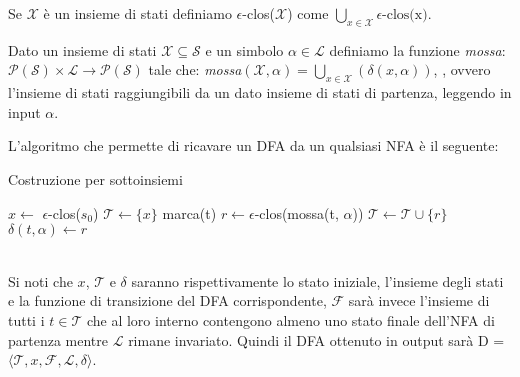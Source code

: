 \begin{remark}
    Se $\mathcal{X}$ è un insieme di stati definiamo $\epsilon$-clos($\mathcal{X}$) come $\bigcup_{x \in \mathcal{X}} \epsilon \mbox{-clos(x)}$.
\end{remark}

\begin{definition}[Mossa]
    Dato un insieme di stati $\mathcal{X} \subseteq \mathcal{S}$ e un simbolo $\alpha \in \mathcal{L}$ definiamo la funzione \emph{mossa}: $\mathcal{P(S)} \times \mathcal{L} \longrightarrow \mathcal{P(S)}$ tale che: \emph{mossa}$(\mathcal{X}, \alpha) = \bigcup_{x \in \mathcal{X}}(\delta(x, \alpha))$, , ovvero l'insieme di stati raggiungibili da un dato insieme di stati di partenza, leggendo in input $\alpha$.
\end{definition}
\newpage %
L'algoritmo che permette di ricavare un DFA da un qualsiasi NFA è il seguente:
\begin{algorithm}
    \caption{Costruzione per sottoinsiemi}\label{alg:cap}
    \begin{algorithmic}
        \State $x \gets$ $\epsilon$-clos($s_0$) 
        \State $\mathcal{T} \gets \{ x \}$                   
        \State marca(t)
        \State $r \gets \epsilon$-clos(mossa(t, $\alpha$))
        \State $\mathcal{T} \gets \mathcal{T} \cup \{r\}$
        \EndIf
        \State $\delta(t, \alpha) \gets r$  
        \EndFor
        \EndWhile
    \end{algorithmic}
\end{algorithm}\\
Si noti che $x$, $\mathcal{T}$ e $\delta$ saranno rispettivamente lo stato iniziale, l'insieme degli stati e la funzione di transizione del DFA corrispondente, $\mathcal{F}$ sarà invece l'insieme di tutti i $t \in \mathcal{T}$ che al loro interno contengono almeno uno stato finale dell'NFA di partenza mentre $\mathcal{L}$ rimane invariato. Quindi il DFA ottenuto in output sarà D = $\langle \mathcal{T}, x, \mathcal{F}, \mathcal{L}, \delta \rangle$.

